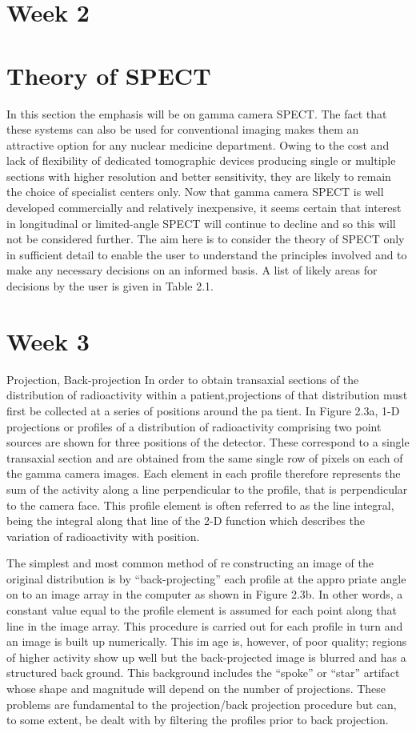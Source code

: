 \documentclass[12pt]{article}
\begin{document}
\section*{Week 2}
\section*{ Theory of SPECT}
In this section the emphasis will be on gamma camera SPECT. The fact that these systems can also be used for conventional imaging makes them an attractive option for any nuclear medicine department. Owing to the cost and lack of flexibility of dedicated tomographic devices producing single or multiple sections with higher resolution and better sensitivity, they are likely to remain the choice of specialist centers only. Now that gamma camera SPECT is well developed commercially and relatively inexpensive, it seems certain that interest in longitudinal or limited-angle SPECT will continue to decline and so this will not be considered further. The aim here is to consider the theory of SPECT
only in sufficient detail to enable the user to understand the principles involved and to make any necessary decisions on an informed basis. A list of likely areas for decisions by the user is given in Table 2.1.

\section*{Week 3}
Projection, Back-projection
In order to obtain transaxial sections of the distribution of radioactivity within a patient,projections of that distribution must first be collected at a series of positions around the patient. In Figure 2.3a, 1-D projections or profiles of a distribution of radioactivity comprising two
point sources are shown for three positions of the detector. These correspond to a single transaxial section and are obtained from the same single row of pixels on each of the gamma camera images. Each element in each profile therefore represents the sum of the activity along a line perpendicular to the profile, that is perpendicular to the camera face. This profile element is often referred to as the line integral, being the integral along that line of the 2-D function which describes the variation of radioactivity with position.

The simplest and most common method of reconstructing an image of the original distribution is by “back-projecting” each profile at the appropriate angle on to an image array in the computer as shown in Figure 2.3b. In other words, a constant value equal to the profile element is assumed for each point along that line in the image array. This procedure is carried out for each profile in turn
and an image is built up numerically. This image is, however, of poor quality; regions of higher activity show up well but the back-projected image is blurred and has a structured background. This background includes the “spoke” or “star” artifact whose shape and magnitude will depend on the number of projections. These problems are fundamental to the projection/backprojection procedure but can, to some extent, be dealt with by filtering the profiles prior to backprojection.
\end{document}
